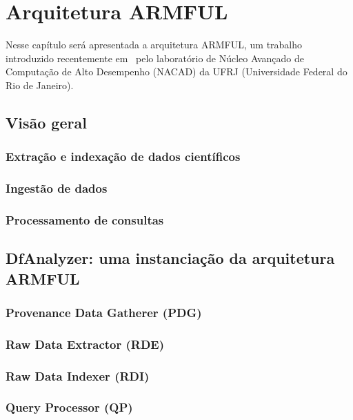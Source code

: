 
\chapter{Arquitetura ARMFUL}%
\label{chap:arquitetura-armful}

Nesse capítulo será apresentada a arquitetura ARMFUL, um trabalho introduzido recentemente em~\cite{silva2016situ,silva2017raw} pelo laboratório de  Núcleo Avançado de Computação de Alto Desempenho (NACAD) da  UFRJ (Universidade Federal do Rio de Janeiro).

\section{Visão geral}


\subsection{Extração e indexação de dados científicos}


\subsection{Ingestão de dados}


\subsection{Processamento de consultas}



\section{DfAnalyzer: uma instanciação da arquitetura ARMFUL}

\subsection{Provenance Data Gatherer (PDG)}

\subsection{Raw Data Extractor (RDE)}

\subsection{Raw Data Indexer (RDI)}

\subsection{Query Processor (QP)}